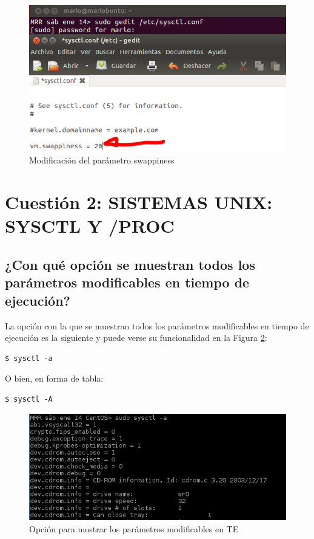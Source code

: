 \begin{figure}[H] %
	\centering
	\includegraphics[scale=0.8]{figuras/ejercicio1/figura1-2.png} 
	\caption{Modificación del parámetro swappiness } 
	\label{fig:figura1-2}
\end{figure}

\section{Cuestión 2: SISTEMAS UNIX: SYSCTL Y /PROC}
\subsection{¿Con qué opción se muestran todos los parámetros
	modificables en tiempo de ejecución?}
La opción con la que se muestran todos los parámetros modificables en tiempo de ejecución es la siguiente\cite{enlace1} y puede verse su funcionalidad en la Figura \ref{fig:figura2-1}:
\begin{lstlisting}[style=fich]
$ sysctl -a
\end{lstlisting}
\vspace{-15pt}
O bien, en forma de tabla:
\begin{lstlisting}[style=fich]
$ sysctl -A
\end{lstlisting}
\vspace{-18pt}
\begin{figure}[H] %
	\centering
	\includegraphics[scale=0.9]{figuras/ejercicio2/figura2-1.png} 
	\caption{Opción para mostrar los parámetros modificables en TE} 
	\label{fig:figura2-1}
\end{figure}
